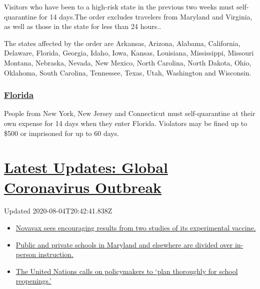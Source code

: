 Visitors who have been to a high-risk state in the previous two weeks
must self-quarantine for 14 days.The order excludes travelers from
Maryland and Virginia, as well as those in the state for less than 24
hours..

The states affected by the order are Arkansas, Arizona, Alabama,
California, Delaware, Florida, Georgia, Idaho, Iowa, Kansas, Louisiana,
Mississippi, Missouri Montana, Nebraska, Nevada, New Mexico, North
Carolina, North Dakota, Ohio, Oklahoma, South Carolina, Tennessee,
Texas, Utah, Washington and Wisconsin.

\hypertarget{florida}{%
\subsubsection{\texorpdfstring{\href{https://floridahealthcovid19.gov/travelers/}{Florida}}{Florida}}\label{florida}}

People from New York, New Jersey and Connecticut must self-quarantine at
their own expense for 14 days when they enter Florida. Violators may be
fined up to \$500 or imprisoned for up to 60 days.

\hypertarget{latest-updates-global-coronavirus-outbreak}{%
\section{\texorpdfstring{\href{https://www.nytimes3xbfgragh.onion/2020/08/04/world/coronavirus-cases.html?action=click\&pgtype=Article\&state=default\&region=MAIN_CONTENT_1\&context=storylines_live_updates}{Latest
Updates: Global Coronavirus
Outbreak}}{Latest Updates: Global Coronavirus Outbreak}}\label{latest-updates-global-coronavirus-outbreak}}

Updated 2020-08-04T20:42:41.838Z

\begin{itemize}
\tightlist
\item
  \href{https://www.nytimes3xbfgragh.onion/2020/08/04/world/coronavirus-cases.html?action=click\&pgtype=Article\&state=default\&region=MAIN_CONTENT_1\&context=storylines_live_updates\#link-1228a480}{Novavax
  sees encouraging results from two studies of its experimental
  vaccine.}
\item
  \href{https://www.nytimes3xbfgragh.onion/2020/08/04/world/coronavirus-cases.html?action=click\&pgtype=Article\&state=default\&region=MAIN_CONTENT_1\&context=storylines_live_updates\#link-4825b93}{Public
  and private schools in Maryland and elsewhere are divided over
  in-person instruction.}
\item
  \href{https://www.nytimes3xbfgragh.onion/2020/08/04/world/coronavirus-cases.html?action=click\&pgtype=Article\&state=default\&region=MAIN_CONTENT_1\&context=storylines_live_updates\#link-50f7386d}{The
  United Nations calls on policymakers to `plan thoroughly for school
  reopenings.'}
\end{itemize}

